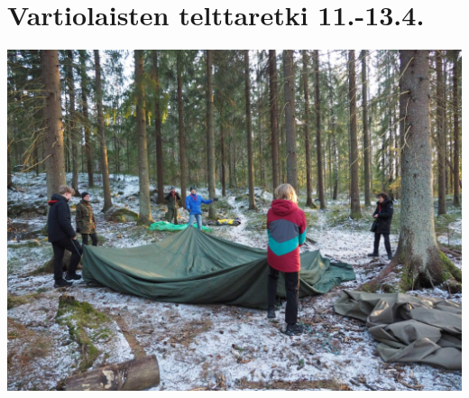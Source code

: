
\section{Vartiolaisten telttaretki 11.-13.4.}

\noindent\includegraphics[width=1.0\linewidth]{assets/telttaretki4}

